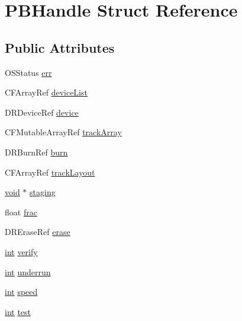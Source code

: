 \hypertarget{struct_p_b_handle}{}\section{P\+B\+Handle Struct Reference}
\label{struct_p_b_handle}
\subsection*{Public Attributes}
\begin{DoxyCompactItemize}
\item 
O\+S\+Status \hyperlink{struct_p_b_handle_aaee4fff5e93b7d98ceddd6cd8da97a98}{err}
\item 
C\+F\+Array\+Ref \hyperlink{struct_p_b_handle_ace5047183d08047e660c0252ca5c5dc9}{device\+List}
\item 
D\+R\+Device\+Ref \hyperlink{struct_p_b_handle_a95ad518d3bb1ffa20f7424f32b5cf513}{device}
\item 
C\+F\+Mutable\+Array\+Ref \hyperlink{struct_p_b_handle_a24b93dede18d46cfc6db8d2669126ba4}{track\+Array}
\item 
D\+R\+Burn\+Ref \hyperlink{struct_p_b_handle_a48175aac5ed9a8fcdc93d96123230a14}{burn}
\item 
C\+F\+Array\+Ref \hyperlink{struct_p_b_handle_a1fc12fc6d9de5089916397f33e843090}{track\+Layout}
\item 
\hyperlink{sound_8c_ae35f5844602719cf66324f4de2a658b3}{void} $\ast$ \hyperlink{struct_p_b_handle_ad03bd1b9e7af8cc95d28026b4697497d}{staging}
\item 
float \hyperlink{struct_p_b_handle_a0cb1ec04f264e77d67ac50f10cd83b43}{frac}
\item 
D\+R\+Erase\+Ref \hyperlink{struct_p_b_handle_abf80ec4272e96d2b3db16f8e6f125294}{erase}
\item 
\hyperlink{xmltok_8h_a5a0d4a5641ce434f1d23533f2b2e6653}{int} \hyperlink{struct_p_b_handle_a690a729e71fd49142f0da5601da53b7f}{verify}
\item 
\hyperlink{xmltok_8h_a5a0d4a5641ce434f1d23533f2b2e6653}{int} \hyperlink{struct_p_b_handle_a64d77979344b7a77e06e82fbd6b26bcb}{underrun}
\item 
\hyperlink{xmltok_8h_a5a0d4a5641ce434f1d23533f2b2e6653}{int} \hyperlink{struct_p_b_handle_a641d9dca452330d9cb5ce167acb5376f}{speed}
\item 
\hyperlink{xmltok_8h_a5a0d4a5641ce434f1d23533f2b2e6653}{int} \hyperlink{struct_p_b_handle_a5efb27a01890a9cc8c009e1fa3bacd78}{test}
\item 

\end{DoxyCompactItemize}
